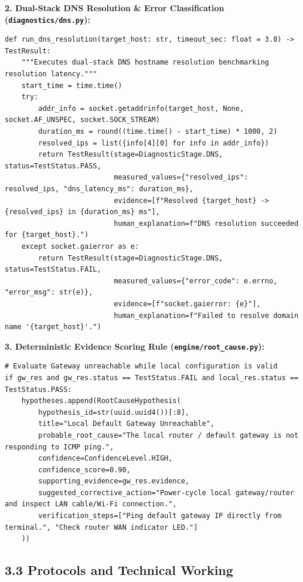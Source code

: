 \documentclass[
]{article}
\begin{document}
\vspace{0.2cm}
\textbf{2. Dual-Stack DNS Resolution & Error Classification (\texttt{diagnostics/dns.py}):}
\begin{verbatim}
def run_dns_resolution(target_host: str, timeout_sec: float = 3.0) -> TestResult:
    """Executes dual-stack DNS hostname resolution benchmarking resolution latency."""
    start_time = time.time()
    try:
        addr_info = socket.getaddrinfo(target_host, None, socket.AF_UNSPEC, socket.SOCK_STREAM)
        duration_ms = round((time.time() - start_time) * 1000, 2)
        resolved_ips = list({info[4][0] for info in addr_info})
        return TestResult(stage=DiagnosticStage.DNS, status=TestStatus.PASS,
                          measured_values={"resolved_ips": resolved_ips, "dns_latency_ms": duration_ms},
                          evidence=[f"Resolved {target_host} -> {resolved_ips} in {duration_ms} ms"],
                          human_explanation=f"DNS resolution succeeded for {target_host}.")
    except socket.gaierror as e:
        return TestResult(stage=DiagnosticStage.DNS, status=TestStatus.FAIL,
                          measured_values={"error_code": e.errno, "error_msg": str(e)},
                          evidence=[f"socket.gaierror: {e}"],
                          human_explanation=f"Failed to resolve domain name '{target_host}'.")
\end{verbatim}

\vspace{0.2cm}
\textbf{3. Deterministic Evidence Scoring Rule (\texttt{engine/root_cause.py}):}
\begin{verbatim}
# Evaluate Gateway unreachable while local configuration is valid
if gw_res and gw_res.status == TestStatus.FAIL and local_res.status == TestStatus.PASS:
    hypotheses.append(RootCauseHypothesis(
        hypothesis_id=str(uuid.uuid4())[:8],
        title="Local Default Gateway Unreachable",
        probable_root_cause="The local router / default gateway is not responding to ICMP ping.",
        confidence=ConfidenceLevel.HIGH,
        confidence_score=0.90,
        supporting_evidence=gw_res.evidence,
        suggested_corrective_action="Power-cycle local gateway/router and inspect LAN cable/Wi-Fi connection.",
        verification_steps=["Ping default gateway IP directly from terminal.", "Check router WAN indicator LED."]
    ))
\end{verbatim}

\subsection{3.3 Protocols and Technical Working}\label{protocols-and-technical-working}
\end{document}
